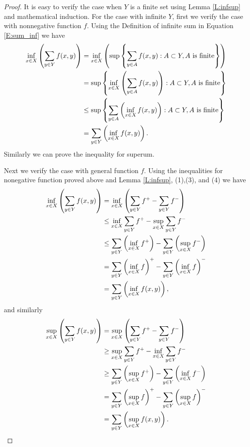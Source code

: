 \begin{proof}
It is easy to verify the case when $Y$ is a finite set using Lemma
\ref{L:infsup} and mathematical induction. For the case with infinite 
$Y$, first we verify the case with nonnegative function $f$. 
Using the Definition of infinite sum in Equation \ref{E:sum_inf} we have
\begin{align*}
  \inf_{x\in X} \left( \sum_{y\in Y} f(x,y) \right)
    &= \inf_{x\in X} \left(
       \sup\left\{ \sum_{y\in A} f(x,y)
         : A\subset Y, \text{$A$ is finite} \right\} \right) \notag \\
    &= \sup
       \left\{ 
         \inf_{x\in X} \left( \sum_{y\in A} f(x,y) \right)
         : A\subset Y, \text{$A$ is finite} 
       \right\}  \notag \\
    &\le \sup
       \left\{ 
         \sum_{y\in A} \left( \inf_{x\in X} f(x,y) \right)
         : A\subset Y, \text{$A$ is finite} 
       \right\}  \notag \\
    &= \sum_{y\in Y} \left( \inf_{x\in X} f(x,y) \right).
\end{align*}
Similarly we can prove the inequality for superum.

Next we verify the case with general function $f$. Using the inequalities for
nonegative function proved above and Lemma \ref{L:infsup}, (1),(3), and (4)
we have
\begin{align*}
  \inf_{x\in X} \left( \sum_{y\in Y} f(x,y) \right)
    &= \inf_{x\in X} \left( \sum_{y\in Y} f^+ - \sum_{y\in Y} f^- \right)
      \notag \\
    &\le \inf_{x\in X} \sum_{y\in Y} f^+  - \sup_{x\in X} \sum_{y\in Y} f^- 
      \notag \\
    &\le \sum_{y\in Y} \left( \inf_{x\in X} f^+ \right)  
         - \sum_{y\in Y} \left( \sup_{x\in X} f^- \right) \notag \\
    &= \sum_{y\in Y} \left( \inf_{x\in X} f \right)^+
         - \sum_{y\in Y} \left( \inf_{x\in X} f \right)^- \notag \\
    &= \sum_{y\in Y} \left( \inf_{x\in X} f(x,y) \right),
\end{align*}
and similarly
\begin{align*}
  \sup_{x\in X} \left( \sum_{y\in Y} f(x,y) \right)
    &= \sup_{x\in X} \left( \sum_{y\in Y} f^+ - \sum_{y\in Y} f^- \right)
      \notag \\
    &\ge \sup_{x\in X} \sum_{y\in Y} f^+  - \inf_{x\in X} \sum_{y\in Y} f^- 
      \notag \\
    &\ge \sum_{y\in Y} \left( \sup_{x\in X} f^+ \right)  
         - \sum_{y\in Y} \left( \inf_{x\in X} f^- \right) \notag \\
    &= \sum_{y\in Y} \left( \sup_{x\in X} f \right)^+
         - \sum_{y\in Y} \left( \sup_{x\in X} f \right)^- \notag \\
    &= \sum_{y\in Y} \left( \sup_{x\in X} f(x,y) \right).
\end{align*}




\end{proof}


